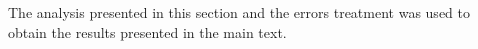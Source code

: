 \documentclass[journal=nalefd,manuscript=letter]{achemso}
\begin{document}
The analysis presented in this section and the errors treatment was used to obtain the results presented in
the main text. 

%
\end{document}
